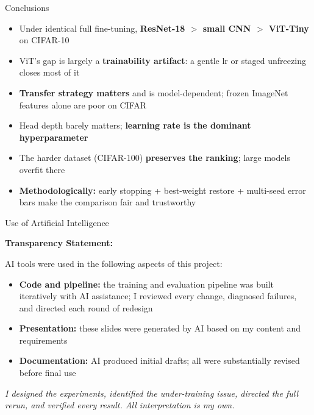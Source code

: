 \documentclass{beamer}
\begin{document}
\begin{frame}{Conclusions}

  \begin{itemize}
    \item Under identical full fine-tuning,
          \textbf{ResNet-18 $>$ small CNN $>$ ViT-Tiny} on CIFAR-10
    \item ViT's gap is largely a \textbf{trainability artifact}: a gentle lr or
          staged unfreezing closes most of it
    \item \textbf{Transfer strategy matters} and is model-dependent;
          frozen ImageNet features alone are poor on CIFAR
    \item Head depth barely matters;
          \textbf{learning rate is the dominant hyperparameter}
    \item The harder dataset (CIFAR-100) \textbf{preserves the ranking};
          large models overfit there
    \item \textbf{Methodologically:} early stopping + best-weight restore +
          multi-seed error bars make the comparison fair and trustworthy
  \end{itemize}


\end{frame}

\begin{frame}{Use of Artificial Intelligence}

  \textbf{Transparency Statement:}

  AI tools were used in the following aspects of this project:
  \begin{itemize}
    \item \textbf{Code and pipeline:} the training and evaluation pipeline was
          built iteratively with AI assistance; I reviewed every change, diagnosed
          failures, and directed each round of redesign
    \item \textbf{Presentation:} these slides were generated by AI based on my
          content and requirements
    \item \textbf{Documentation:} AI produced initial drafts; all were
          substantially revised before final use
  \end{itemize}

  \bigskip
  \textit{I designed the experiments, identified the under-training issue,
  directed the full rerun, and verified every result.
  All interpretation is my own.}

\end{frame}
\end{document}
